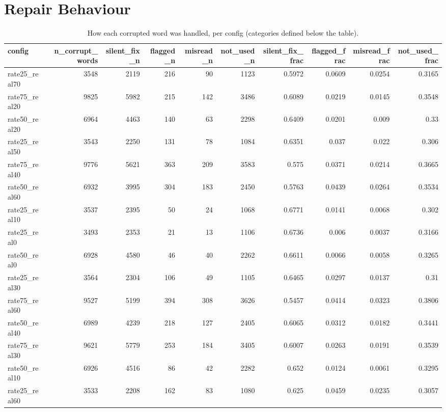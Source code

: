 \documentclass[11pt]{article}
\begin{document}
\section*{Repair Behaviour}
\begin{table}[H]
\centering
\caption{How each corrupted word was handled, per config (categories defined below the table).}
\small
\begin{adjustbox}{max width=\textwidth}
\begin{tabular}{lrrrrrrrrr}
\toprule
\textbf{config} & \textbf{n\_corrupt\_words} & \textbf{silent\_fix\_n} & \textbf{flagged\_n} & \textbf{misread\_n} & \textbf{not\_used\_n} & \textbf{silent\_fix\_frac} & \textbf{flagged\_frac} & \textbf{misread\_frac} & \textbf{not\_used\_frac} \\
\midrule
rate25\_real70 & 3548 & 2119 & 216 & 90 & 1123 & 0.5972 & 0.0609 & 0.0254 & 0.3165 \\
rate75\_real20 & 9825 & 5982 & 215 & 142 & 3486 & 0.6089 & 0.0219 & 0.0145 & 0.3548 \\
rate50\_real20 & 6964 & 4463 & 140 & 63 & 2298 & 0.6409 & 0.0201 & 0.009 & 0.33 \\
rate25\_real50 & 3543 & 2250 & 131 & 78 & 1084 & 0.6351 & 0.037 & 0.022 & 0.306 \\
rate75\_real40 & 9776 & 5621 & 363 & 209 & 3583 & 0.575 & 0.0371 & 0.0214 & 0.3665 \\
rate50\_real60 & 6932 & 3995 & 304 & 183 & 2450 & 0.5763 & 0.0439 & 0.0264 & 0.3534 \\
rate25\_real10 & 3537 & 2395 & 50 & 24 & 1068 & 0.6771 & 0.0141 & 0.0068 & 0.302 \\
rate25\_real0 & 3493 & 2353 & 21 & 13 & 1106 & 0.6736 & 0.006 & 0.0037 & 0.3166 \\
rate50\_real0 & 6928 & 4580 & 46 & 40 & 2262 & 0.6611 & 0.0066 & 0.0058 & 0.3265 \\
rate25\_real30 & 3564 & 2304 & 106 & 49 & 1105 & 0.6465 & 0.0297 & 0.0137 & 0.31 \\
rate75\_real60 & 9527 & 5199 & 394 & 308 & 3626 & 0.5457 & 0.0414 & 0.0323 & 0.3806 \\
rate50\_real40 & 6989 & 4239 & 218 & 127 & 2405 & 0.6065 & 0.0312 & 0.0182 & 0.3441 \\
rate75\_real30 & 9621 & 5779 & 253 & 184 & 3405 & 0.6007 & 0.0263 & 0.0191 & 0.3539 \\
rate50\_real10 & 6926 & 4516 & 86 & 42 & 2282 & 0.652 & 0.0124 & 0.0061 & 0.3295 \\
rate25\_real60 & 3533 & 2208 & 162 & 83 & 1080 & 0.625 & 0.0459 & 0.0235 & 0.3057 \\

\end{tabular}
\end{adjustbox}
\end{table}
\end{document}
